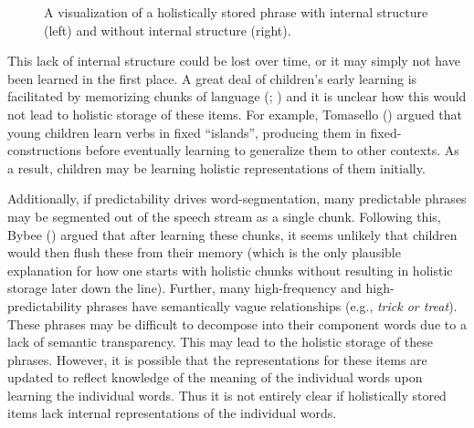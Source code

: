 \documentclass[
  12pt,
  letterpaper,
]{scrreport}
\begin{document}
\begin{figure}[htbp]

\caption{\label{fig-nointernalstructure2}A visualization of a
holistically stored phrase with internal structure (left) and without
internal structure (right).}


\end{figure}%

This lack of internal structure could be lost over time, or it may
simply not have been learned in the first place. A great deal of
children's early learning is facilitated by memorizing chunks of
language (;
) and it is unclear how this would not lead to holistic storage of
these items. For example, Tomasello
()
argued that young children learn verbs in fixed ``islands'', producing
them in fixed-constructions before eventually learning to generalize
them to other contexts. As a result, children may be learning holistic
representations of them initially.

Additionally, if predictability drives word-segmentation, many
predictable phrases may be segmented out of the speech stream as a
single chunk. Following this, Bybee ()
argued that after learning these chunks, it seems unlikely that children
would then flush these from their memory (which is the only plausible
explanation for how one starts with holistic chunks without resulting in
holistic storage later down the line). Further, many high-frequency and
high-predictability phrases have semantically vague relationships (e.g.,
\emph{trick or treat}). These phrases may be difficult to decompose into
their component words due to a lack of semantic transparency. This may
lead to the holistic storage of these phrases. However, it is possible
that the representations for these items are updated to reflect
knowledge of the meaning of the individual words upon learning the
individual words. Thus it is not entirely clear if holistically stored
items lack internal representations of the individual words.
\end{document}
